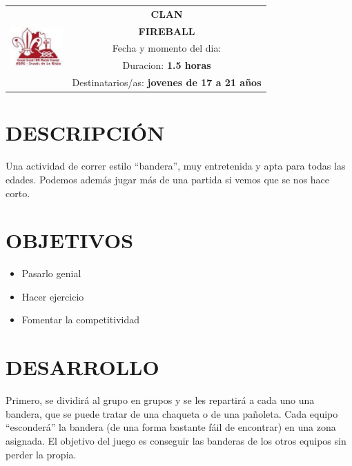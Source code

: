 \documentclass[72pt]{article}
\newlength{\w}
\begin{document}
\large
{}\selectfont
\begin{tabular}{|p{2cm}|c|}
\hline
\multirow{5}{*}{\includegraphics[width=2cm]{logo}} & \textbf{CLAN} \\ %
\cline{2-2}
& \textbf{FIREBALL} \\ %
\cline{2-2}
& \parbox{\textwidth-4cm}{Fecha y momento del dia: \textbf{}} \\ %
& \parbox{\textwidth-4cm}{Duracion: \textbf{1.5 horas}} \\ %
& \parbox{\textwidth-4cm}{Destinatarios/as: \textbf{jovenes de 17 a 21 años}} \\ %
\hline
\end{tabular}

\section*{DESCRIPCI\'ON}
Una actividad de correr estilo ``bandera'', muy entretenida y apta para todas las edades.
Podemos además jugar más de una partida si vemos que se nos hace corto. 

\section*{OBJETIVOS}
\begin{itemize}
    \item Pasarlo genial
    \item Hacer ejercicio
    \item Fomentar la competitividad
\end{itemize}

\section*{DESARROLLO}
Primero, se dividirá al grupo en grupos y se les repartirá a cada uno una bandera, que se puede tratar de
una chaqueta o de una pañoleta. Cada equipo ``esconderá'' la bandera (de una forma bastante fáil de encontrar)
en una zona asignada. El objetivo del juego es conseguir las banderas de los otros equipos sin perder la propia.
\end{document}

